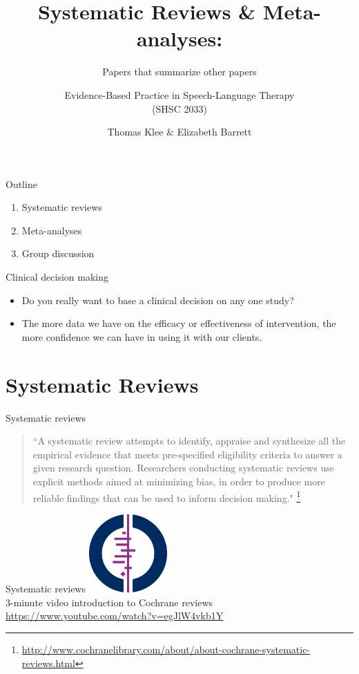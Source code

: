 \documentclass{beamer}
\title{Systematic Reviews \& Meta-analyses:}
\subtitle{Papers that summarize other papers}
\author{Evidence-Based Practice in Speech-Language Therapy \\ (SHSC 2033)}
\institute{Session 4}
\date{Thomas Klee \& Elizabeth Barrett}
\begin{document}
\begin{frame}
	\titlepage
\end{frame}

% 
\begin{frame}{Outline}
	\begin{enumerate}
	\item Systematic reviews
	\item Meta-analyses
	\item Group discussion
	\end {enumerate}
\end{frame}

% 
\begin{frame}{Clinical decision making}
	\begin{itemize}
	\item Do you really want to base a clinical decision on any one study?
	\item The more data we have on the efficacy or effectiveness of intervention, the more confidence we can have in using it with our clients.
	\end {itemize}
\end{frame}

\section*{Systematic Reviews}

%
\begin{frame}
\center{\Huge{\textcolor{darkgray}{Systematic Reviews}}}
\end{frame}

% 
\begin{frame}{Systematic reviews}
\begin{quote}
``A systematic review attempts to identify, appraise and synthesize all the empirical evidence that meets pre-specified eligibility criteria to answer a given research question. Researchers conducting systematic reviews use explicit methods aimed at minimizing bias, in order to produce more reliable findings that can be used to inform decision making." \footnote{\tiny{{\url{http://www.cochranelibrary.com/about/about-cochrane-systematic-reviews.html}}}}
\end{quote}
\end{frame}

%
\begin{frame}{Systematic reviews}
\centering
\includegraphics[width=3cm]{images/cochrane_logo_400.jpg} \\
\vspace{0.5cm}
3-minute video introduction to Cochrane reviews
\url{https://www.youtube.com/watch?v=egJlW4vkb1Y}
\end{frame}
\end{document}
